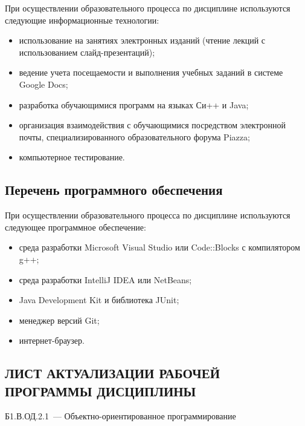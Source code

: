 \documentclass[a4paper,12pt]{article}
\begin{document}
При осуществлении образовательного процесса по дисциплине используются следующие информационные технологии:
\begin{itemize}[nolistsep]
  
\item использование на занятиях электронных изданий (чтение лекций с использованием слайд-презентаций);
  
\item ведение учета посещаемости и выполнения учебных заданий в системе Google Docs;
  
\item разработка обучающимися программ на языках Си++ и Java;
  
\item организация взаимодействия с обучающимися посредством электронной почты, специализированного образовательного форума Piazza;
  
\item компьютерное тестирование.
  
\end{itemize}

\subsection{Перечень программного обеспечения}
При осуществлении образовательного процесса по дисциплине используются следующее программное обеспечение:
\begin{itemize}[nolistsep]
  
\item среда разработки Microsoft Visual Studio или Code::Blocks с компилятором g++;
  
\item среда разработки IntelliJ IDEA или NetBeans;
  
\item Java Development Kit и библиотека JUnit;
  
\item менеджер версий Git;
  
\item интернет-браузер.
  
\end{itemize}



\newpage
\begin{center}
\section*{ЛИСТ АКТУАЛИЗАЦИИ РАБОЧЕЙ ПРОГРАММЫ ДИСЦИПЛИНЫ}
Б1.В.ОД.2.1\ --- Объектно-ориентированное программирование 
\end{center}
\end{document}
